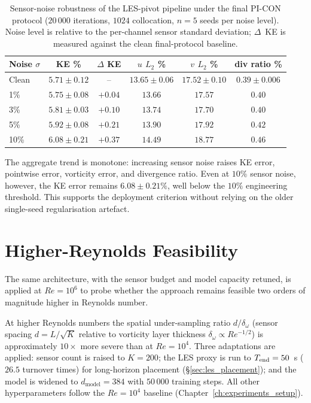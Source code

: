 \begin{table}[!htbp]
    \centering
    \caption{Sensor-noise robustness of the LES-pivot pipeline under the final PI-CON protocol ($20\,000$ iterations, $1024$ collocation, $n=5$ seeds per noise level). Noise level is relative to the per-channel sensor standard deviation; $\Delta$~KE is measured against the clean final-protocol baseline.}
    \label{tab:noise_robustness}
    \small
    \setlength{\tabcolsep}{5pt}
    \begin{tabular}{lccccc}
    \toprule
    \textbf{Noise $\sigma$} & \textbf{KE \%} & \textbf{$\Delta$ KE} & \textbf{$u$ $L_2$ \%} & \textbf{$v$ $L_2$ \%} & \textbf{div ratio \%} \\
    \midrule
    Clean & $5.71 {\pm} 0.12$ & -- & $13.65 {\pm} 0.06$ & $17.52 {\pm} 0.10$ & $0.39 {\pm} 0.006$ \\
    1\%  & $5.75 {\pm} 0.08$ & $+0.04$ & $13.66$ & $17.57$ & $0.40$ \\
    3\%  & $5.81 {\pm} 0.03$ & $+0.10$ & $13.74$ & $17.70$ & $0.40$ \\
    5\%  & $5.92 {\pm} 0.08$ & $+0.21$ & $13.90$ & $17.92$ & $0.42$ \\
    10\% & $6.08 {\pm} 0.21$ & $+0.37$ & $14.49$ & $18.77$ & $0.46$ \\
    \bottomrule
    \end{tabular}
\end{table}

The aggregate trend is monotone: increasing sensor noise raises KE error, pointwise error, vorticity error, and divergence ratio. Even at $10\%$ sensor noise, however, the KE error remains $6.08 \pm 0.21\%$, well below the $10\%$ engineering threshold. This supports the deployment criterion without relying on the older single-seed regularisation artefact.

\section{Higher-Reynolds Feasibility}
\label{sec:cross_reynolds}

The same architecture, with the sensor budget and model capacity retuned, is applied at $Re=10^{6}$ to probe whether the approach remains feasible two orders of magnitude higher in Reynolds number.

At higher Reynolds numbers the spatial under-sampling ratio $d/\delta_\omega$ (sensor spacing $d = L/\sqrt{K}$ relative to vorticity layer thickness $\delta_\omega \propto Re^{-1/2}$) is approximately $10\times$ more severe than at $Re=10^{4}$.
Three adaptations are applied: sensor count is raised to $K=200$; the LES proxy is run to $T_{\rm end}=50$~s ($26.5$ turnover times) for long-horizon placement (\S\ref{sec:les_placement}); and the model is widened to $d_\text{model}=384$ with $50\,000$ training steps.
All other hyperparameters follow the $Re=10^{4}$ baseline (Chapter~\ref{ch:experiments_setup}).

